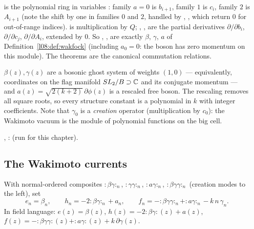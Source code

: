 \begin{dictionary}
 is the polynomial ring in variables : family
$a=0$ is $b_{i+1}$, family $1$ is $c_i$, family $2$ is $A_{i+1}$ (note the shift by one in families
$0$ and $2$, handled by , , which return $0$ for out-of-range indices). 
is multiplication by $Q$; , ,  are the partial derivatives
$\partial/\partial b_i$, $\partial/\partial c_j$, $\partial/\partial A_i$, extended by $0$. So
, ,  are exactly $\beta$, $\gamma$, $a$ of Definition~\ref{l08:def:wakfock}
(including $a_0 = 0$: the boson has zero momentum on this module). The theorems are the canonical
commutation relations.
\end{dictionary}

\begin{physics}
$\beta(z),\gamma(z)$ are a bosonic ghost system of weights $(1,0)$ --- equivalently, coordinates on
the flag manifold $SL_2/B\supset{\mathbb{C}}$ and its conjugate momentum --- and $a(z) = \sqrt{2(k+2)}\,\partial\phi(z)$
is a rescaled free boson. The rescaling removes all square roots, so every structure constant is a
polynomial in $k$ with integer coefficients. Note that $\gamma_0$ is a \emph{creation} operator
(multiplication by $c_0$): the Wakimoto vacuum is the module of polynomial functions on the big cell.
\end{physics}

\begin{status}
, : \lean{[propext, Classical.}\allowbreak{}\allowbreak\lean{sound]} (run for this
chapter).
\end{status}

\subsection{The Wakimoto currents}

\begin{definition}\label{l08:def:wakcur}
With normal-ordered composites ${:}\beta\gamma{:}_n$, ${:}\gamma\gamma{:}_n$, ${:}a\gamma{:}_n$,
${:}\beta\gamma\gamma{:}_n$ (creation modes to the left), set
\begin{equation}\label{l08:eq:wakimoto}
  e_n = \beta_n,\qquad h_n = -2{:}\beta\gamma{:}_n + a_n,\qquad
  f_n = -{:}\beta\gamma\gamma{:}_n + {:}a\gamma{:}_n - k\,n\,\gamma_n .
\end{equation}
In field language: $e(z)=\beta(z)$, $h(z) = -2{:}\beta\gamma{:}(z)+a(z)$,
$f(z) = -{:}\beta\gamma\gamma{:}(z) + {:}a\gamma{:}(z) + k\,\partial\gamma(z)$.
\end{definition}

